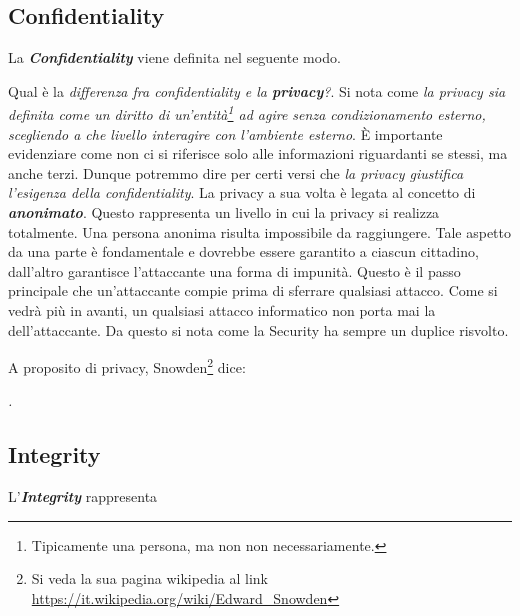 \documentclass[14pt]{extreport}
\begin{document}
\subsection{Confidentiality}
La \textbf{\textit{Confidentiality}} viene definita nel seguente modo. 

\begin{center}
    \textit{}\cite{rfc}
\end{center}


Qual è la \textit{differenza fra confidentiality e la \textbf{privacy}?}. Si nota\cite{rfc} come \textit{la privacy sia definita come un diritto di un'entità\footnote{Tipicamente una persona, ma non non necessariamente.} ad agire senza condizionamento esterno, scegliendo a che livello interagire con l'ambiente esterno}. È importante evidenziare come non ci si riferisce solo alle informazioni riguardanti se stessi, ma anche terzi.
Dunque potremmo dire per certi versi che \textit{la privacy giustifica l'esigenza della confidentiality}.
La privacy a sua volta è legata al concetto di \textit{\textbf{anonimato}}. Questo rappresenta un livello in cui la privacy si realizza totalmente. Una persona anonima risulta impossibile da raggiungere. Tale aspetto da una parte è fondamentale e dovrebbe essere garantito a ciascun cittadino, dall'altro garantisce l'attaccante una forma di impunità. Questo è il passo principale che un'attaccante compie prima di sferrare qualsiasi attacco. Come si vedrà più in avanti, un qualsiasi attacco informatico non porta mai la  dell'attaccante. Da questo si nota come la Security ha sempre un duplice risvolto.

A proposito di privacy, Snowden\footnote{Si veda la sua pagina wikipedia al link \url{https://it.wikipedia.org/wiki/Edward_Snowden} } dice: 

\begin{center}
    \textit{.}
\end{center}   
    

    
\subsection{Integrity}
L'\textbf{\textit{Integrity}} rappresenta 
\end{document}
